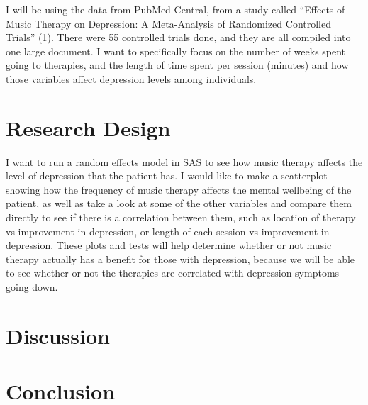 \documentclass[12pt]{article}
\begin{document}
 I will be using the data from PubMed Central, from a study called “Effects of Music Therapy on Depression: A Meta-Analysis of Randomized Controlled Trials” (1). There were 55 controlled trials done, and they are all compiled into one large document. I want to specifically focus on the number of weeks spent going to therapies, and the length of time spent per session (minutes) and how those variables affect depression levels among individuals.


 \section{Research Design}
 \label{sec:research}

 I want to run a random effects model in SAS to see how music therapy affects the level of depression that the patient has. I would like to make a scatterplot showing how the frequency of music therapy affects the mental wellbeing of the patient, as well as take a look at some of the other variables and compare them directly to see if there is a correlation between them, such as location of therapy vs improvement in depression, or length of each session vs improvement in depression. These plots and tests will help determine whether or not music therapy actually has a benefit for those with depression, because we will be able to see whether or not the therapies are correlated with depression symptoms going down.

 \section{Discussion}
 \label{sec:disc}


 \section{Conclusion}
 \label{sec:con}
 

 
 
\end{document}
